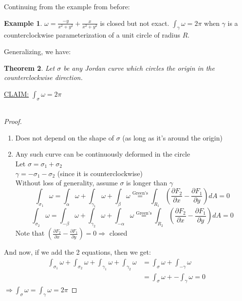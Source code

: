 \documentclass[12pt]{article}
\theoremstyle{plain}
\newtheorem{theorem}{Theorem}[section]
\theoremstyle{definition}
\newtheorem{example}[theorem]{Example}
\begin{document}
Continuing from the example from before:

\begin{example}
	$\omega = \frac{-y}{x^2+y^2} + \frac{x}{x^2+y^2}$ is closed but not exact. $\int_\gamma \omega = 2\pi$ when $\gamma$ is a counterclockwise parameterization of a unit circle of radius $R$.
\end{example}

	Generalizing, we have:
	\begin{theorem}
		Let $\sigma$ be any Jordan curve which circles the origin in the counterclockwise direction.
	\end{theorem}
	\underline{CLAIM:} $\int_\sigma \omega = 2\pi$\\
	\\
	\begin{proof}
		\begin{enumerate}
			\item{Does not depend on the shape of $\sigma$ (as long as it's around the origin)}
			\item{
			Any such curve can be continuously deformed in the circle\\
			Let $\sigma = \sigma_1 + \sigma_2$\\
			$\gamma = -\sigma_1 - \sigma_2$ (since it is counterclockwise)\\
			Without loss of generality, assume $\sigma$ is longer than $\gamma$\\
			$$\int_{\sigma_1} \omega = \int_\alpha \omega + \int_{\gamma_1} \omega + \int_{\beta} \omega \overset{\text{Green's}}{=} \int_{R_1} (\frac{\partial F_2}{\partial x} - \frac{\partial F_1}{\partial y}) dA = 0$$
			$$\int_{\sigma_2} \omega = \int_{-\beta} \omega + \int_{\gamma_2} \omega + \int_{-\alpha} \omega \overset{\text{Green's}}{=} \int_{R_2} (\frac{\partial F_2}{\partial x} - \frac{\partial F_1}{\partial y}) dA = 0$$
			Note that $(\frac{\partial F_2}{\partial x} - \frac{\partial F_1}{\partial y}) = 0 \Longrightarrow$ closed
			}
		\end{enumerate}
		And now, if we add the 2 equations, then we get:
		\begin{align*}
			\int_{\sigma_1} \omega + \int_{\sigma_2} \omega + \int_{\gamma_1} \omega + \int_{\gamma_2} \omega &= \int_\sigma \omega + \int_{-\gamma} \omega\\
			&= \int_\sigma \omega + -\int_{\gamma} \omega = 0
		\end{align*}
		$\Longrightarrow \int_\sigma \omega = \int_{\gamma} \omega = 2\pi$
	\end{proof}
\end{document}
